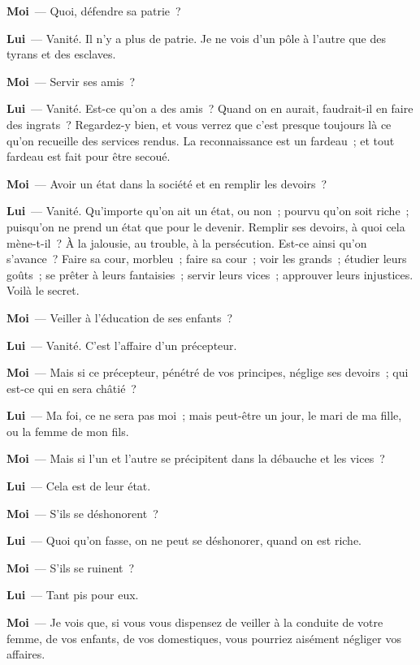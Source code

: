\documentclass[french,twoside]{book} %
\newcommand{\labelchar}[1]{\textbf{\color{rubric} #1}}
\begin{document}
\labelchar{Moi} — Quoi, défendre sa patrie ?\par
\labelchar{Lui} — Vanité. Il n’y a plus de patrie. Je ne vois d’un pôle à l’autre que des tyrans et des esclaves.\par
\labelchar{Moi} — Servir ses amis ?\par
\labelchar{Lui} — Vanité. Est-ce qu’on a des amis ? Quand on en aurait, faudrait-il en faire des ingrats ? Regardez-y bien, et vous verrez que c’est presque toujours là ce qu’on recueille des services rendus. La reconnaissance est un fardeau ; et tout fardeau est fait pour être secoué.\par
\labelchar{Moi} — Avoir un état dans la société et en remplir les devoirs ?\par
\labelchar{Lui} — Vanité. Qu’importe qu’on ait un état, ou non ; pourvu qu’on soit riche ; puisqu’on ne prend un état que pour le devenir. Remplir ses devoirs, à quoi cela mène-t-il ? À la jalousie, au trouble, à la persécution. Est-ce ainsi qu’on s’avance ? Faire sa cour, morbleu ; faire sa cour ; voir les grands ; étudier leurs goûts ; se prêter à leurs fantaisies ; servir leurs vices ; approuver leurs injustices. Voilà le secret.\par
\labelchar{Moi} — Veiller à l’éducation de ses enfants ?\par
\labelchar{Lui} — Vanité. C’est l’affaire d’un précepteur.\par
\labelchar{Moi} — Mais si ce précepteur, pénétré de vos principes, néglige ses devoirs ; qui est-ce qui en sera châtié ?\par
\labelchar{Lui} — Ma foi, ce ne sera pas moi ; mais peut-être un jour, le mari de ma fille, ou la femme de mon fils.\par
\labelchar{Moi} — Mais si l’un et l’autre se précipitent dans la débauche et les vices ?\par
\labelchar{Lui} — Cela est de leur état.\par
\labelchar{Moi} — S’ils se déshonorent ?\par
\labelchar{Lui} — Quoi qu’on fasse, on ne peut se déshonorer, quand on est riche.\par
\labelchar{Moi} — S’ils se ruinent ?\par
\labelchar{Lui} — Tant pis pour eux.\par
\labelchar{Moi} — Je vois que, si vous vous dispensez de veiller à la conduite de votre femme, de vos enfants, de vos domestiques, vous pourriez aisément négliger vos affaires.\par
\end{document}
